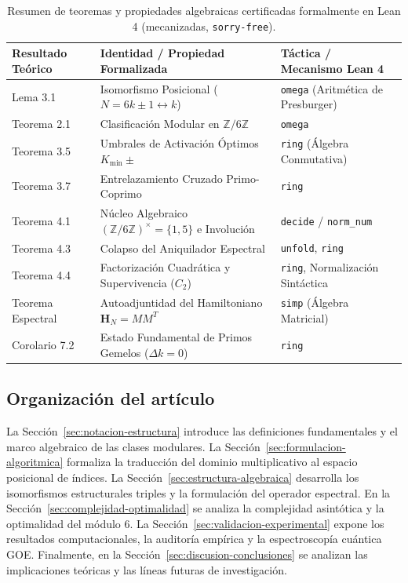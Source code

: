 \documentclass{article}
\numberwithin{equation}{section}
\theoremstyle{plain}
\theoremstyle{definition}
\begin{document}

\begin{table}[htbp]
\centering
\small
\caption{Resumen de teoremas y propiedades algebraicas certificadas formalmente en Lean 4 (mecanizadas, \texttt{sorry-free}).}
\label{tab:lean4-certifications}
\begin{tabular}{lll}
\toprule
\textbf{Resultado Teórico} & \textbf{Identidad / Propiedad Formalizada} & \textbf{Táctica / Mecanismo Lean 4} \\
\midrule
Lema 3.1 & Isomorfismo Posicional ($N = 6k \pm 1 \leftrightarrow k$) & \texttt{omega} (Aritmética de Presburger) \\
Teorema 2.1 & Clasificación Modular en $\mathbb{Z}/6\mathbb{Z}$ & \texttt{omega} \\
Teorema 3.5 & Umbrales de Activación Óptimos $K_{\min}\pm$ & \texttt{ring} (Álgebra Conmutativa) \\
Teorema 3.7 & Entrelazamiento Cruzado Primo-Coprimo & \texttt{ring} \\
Teorema 4.1 & Núcleo Algebraico $(\mathbb{Z}/6\mathbb{Z})^\times = \{1, 5\}$ e Involución & \texttt{decide} / \texttt{norm\_num} \\
Teorema 4.3 & Colapso del Aniquilador Espectral & \texttt{unfold}, \texttt{ring} \\
Teorema 4.4 & Factorización Cuadrática y Supervivencia ($C_2$) & \texttt{ring}, Normalización Sintáctica \\
Teorema Espectral & Autoadjuntidad del Hamiltoniano $\mathbf{H}_N = MM^T$ & \texttt{simp} (Álgebra Matricial) \\
Corolario 7.2 & Estado Fundamental de Primos Gemelos ($\Delta k = 0$) & \texttt{ring} \\
\bottomrule
\end{tabular}
\end{table}

\subsection*{Organización del artículo}

La Sección~\ref{sec:notacion-estructura} introduce las definiciones fundamentales y el marco algebraico de las clases modulares. La Sección~\ref{sec:formulacion-algoritmica} formaliza la traducción del dominio multiplicativo al espacio posicional de índices. La Sección~\ref{sec:estructura-algebraica} desarrolla los isomorfismos estructurales triples y la formulación del operador espectral. En la Sección~\ref{sec:complejidad-optimalidad} se analiza la complejidad asintótica y la optimalidad del módulo 6. La Sección~\ref{sec:validacion-experimental} expone los resultados computacionales, la auditoría empírica y la espectroscopía cuántica GOE. Finalmente, en la Sección~\ref{sec:discusion-conclusiones} se analizan las implicaciones teóricas y las líneas futuras de investigación.
\end{document}
